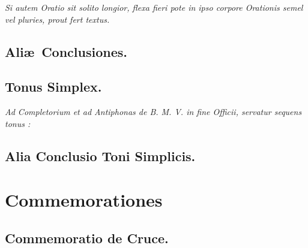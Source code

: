 \documentclass[12pt]{article} %
\newenvironment{rubric}{\vspace{2 mm}\color{benred8} \itshape \leftskip 0in \setlength{\parindent}{0.25in}}{\vspace{2 mm}}
\begin{document}

\vspace{1mm}

\begin{rubric}
Si autem Oratio sit solito longior, flexa fieri pote in ipso corpore Orationis semel vel pluries, prout fert textus.

\end{rubric}

\subsection*{Ali\ae\ Conclusiones.}


\vspace*{-1.0mm}

\subsection*{Tonus Simplex.}

\label{OratioSimplex}

\begin{rubric}
Ad Completorium et ad Antiphonas de B. M. V. in fine Officii, servatur sequens tonus :

\end{rubric}


\subsection*{Alia Conclusio Toni Simplicis.}


\newpage


\section*{Commemorationes}
\label{sec:Commem}

\thispagestyle{plain}


\subsection*{Commemoratio de Cruce.}
\end{document}
